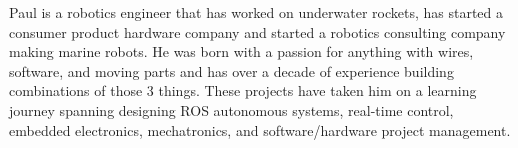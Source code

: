 

\begin{cvparagraph}

Paul is a robotics engineer that has worked on underwater rockets, has started a
consumer product hardware company and started a robotics consulting company
making marine robots. He was born with a passion for anything with wires,
software, and moving parts and has over a decade of experience building
combinations of those 3 things. These projects have taken him on a learning
journey spanning designing ROS autonomous systems, real-time control, embedded
electronics, mechatronics, and software/hardware project management.
\end{cvparagraph}
